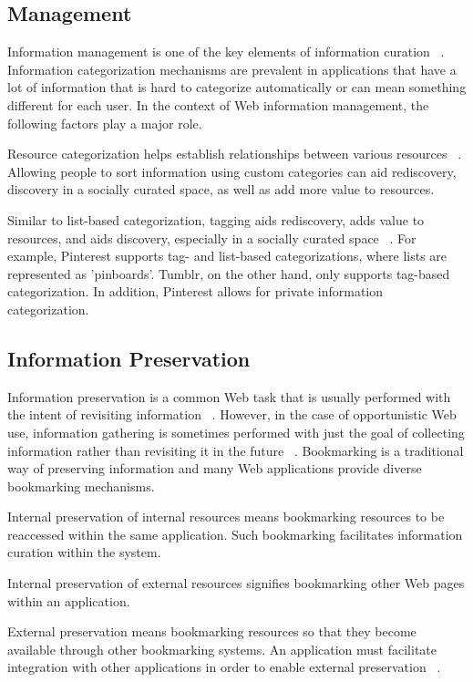 {{\subsection{Management}
Information management is one of the key elements of information curation ~\cite{beagrie, wittaker}. Information categorization mechanisms are prevalent in applications that have a lot of information that is hard to categorize automatically or can mean something different for each user. In the context of Web information management, the following factors play a major role.

Resource categorization helps establish relationships between various resources ~\cite{beagrie, wittaker}. Allowing people to sort information using custom categories can aid rediscovery, discovery in a socially curated space, as well as add more value to resources.

Similar to list-based categorization, tagging aids rediscovery, adds value to resources, and aids discovery, especially in a socially curated space ~\cite{gruber}.  For example, Pinterest supports tag- and list-based categorizations, where lists are represented as 'pinboards'. Tumblr, on the other hand, only supports tag-based categorization. In addition, Pinterest allows for private information categorization.

} %

{\subsection{Information Preservation}
Information preservation is a common Web task that is usually performed with the intent of revisiting information ~\cite{abrams, wittaker}. However, in the case of opportunistic Web use, information gathering is sometimes performed with just the goal of collecting information rather than revisiting it in the future ~\cite{lindley}. Bookmarking is a traditional way of preserving information and many Web applications provide diverse bookmarking mechanisms. 

Internal preservation of internal resources means bookmarking resources to be reaccessed within the same application. Such bookmarking facilitates information curation within the system.

Internal preservation of external resources signifies bookmarking other Web pages within an application. 
  
External preservation means bookmarking resources so that they become available through other bookmarking systems. An application must facilitate integration with other applications in order to enable external preservation ~\cite{abrams}.

}}
